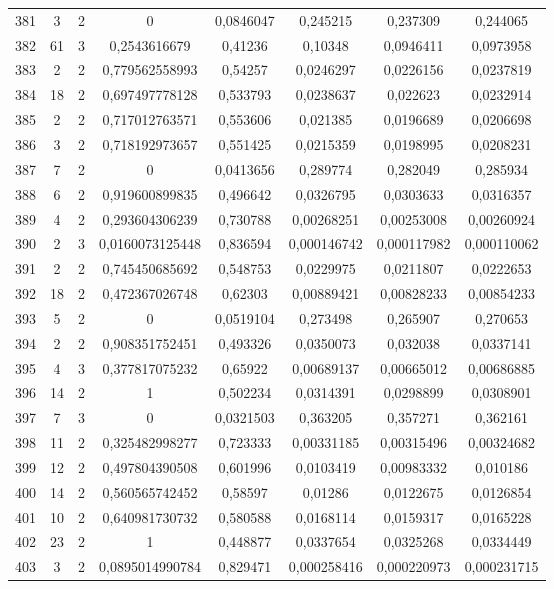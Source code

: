 \begin{longtable}{|c|c|c|c|c|c|c|c|}
381 & 3 & 2 & 0 & 0,0846047 & 0,245215 & 0,237309 & 0,244065  \\
382 & 61 & 3 & 0,2543616679 & 0,41236 & 0,10348 & 0,0946411 & 0,0973958  \\
383 & 2 & 2 & 0,779562558993 & 0,54257 & 0,0246297 & 0,0226156 & 0,0237819  \\
384 & 18 & 2 & 0,697497778128 & 0,533793 & 0,0238637 & 0,022623 & 0,0232914  \\
385 & 2 & 2 & 0,717012763571 & 0,553606 & 0,021385 & 0,0196689 & 0,0206698  \\
386 & 3 & 2 & 0,718192973657 & 0,551425 & 0,0215359 & 0,0198995 & 0,0208231  \\
387 & 7 & 2 & 0 & 0,0413656 & 0,289774 & 0,282049 & 0,285934  \\
388 & 6 & 2 & 0,919600899835 & 0,496642 & 0,0326795 & 0,0303633 & 0,0316357  \\
389 & 4 & 2 & 0,293604306239 & 0,730788 & 0,00268251 & 0,00253008 & 0,00260924  \\
390 & 2 & 3 & 0,0160073125448 & 0,836594 & 0,000146742 & 0,000117982 & 0,000110062  \\
391 & 2 & 2 & 0,745450685692 & 0,548753 & 0,0229975 & 0,0211807 & 0,0222653  \\
392 & 18 & 2 & 0,472367026748 & 0,62303 & 0,00889421 & 0,00828233 & 0,00854233  \\
393 & 5 & 2 & 0 & 0,0519104 & 0,273498 & 0,265907 & 0,270653  \\
394 & 2 & 2 & 0,908351752451 & 0,493326 & 0,0350073 & 0,032038 & 0,0337141  \\
395 & 4 & 3 & 0,377817075232 & 0,65922 & 0,00689137 & 0,00665012 & 0,00686885  \\
396 & 14 & 2 & 1 & 0,502234 & 0,0314391 & 0,0298899 & 0,0308901  \\
397 & 7 & 3 & 0 & 0,0321503 & 0,363205 & 0,357271 & 0,362161  \\
398 & 11 & 2 & 0,325482998277 & 0,723333 & 0,00331185 & 0,00315496 & 0,00324682  \\
399 & 12 & 2 & 0,497804390508 & 0,601996 & 0,0103419 & 0,00983332 & 0,010186  \\
400 & 14 & 2 & 0,560565742452 & 0,58597 & 0,01286 & 0,0122675 & 0,0126854  \\
401 & 10 & 2 & 0,640981730732 & 0,580588 & 0,0168114 & 0,0159317 & 0,0165228  \\
402 & 23 & 2 & 1 & 0,448877 & 0,0337654 & 0,0325268 & 0,0334449  \\
403 & 3 & 2 & 0,0895014990784 & 0,829471 & 0,000258416 & 0,000220973 & 0,000231715  \\

\end{longtable}

